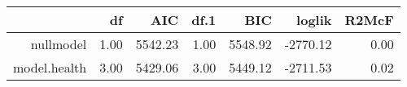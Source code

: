 \begin{table}[ht]
\centering
\begin{tabular}{rrrrrrr}
  \hline
 & df & AIC & df.1 & BIC & loglik & R2McF \\ 
  \hline
nullmodel & 1.00 & 5542.23 & 1.00 & 5548.92 & -2770.12 & 0.00 \\ 
  model.health & 3.00 & 5429.06 & 3.00 & 5449.12 & -2711.53 & 0.02 \\ 
   \hline
\end{tabular}
\end{table}

